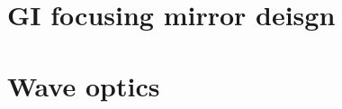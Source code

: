 \documentclass{article}
\begin{document}

	\section{GI focusing mirror deisgn}

	\section{Wave optics}
	{\let\section\subsection
	\let\subsection\subsubsection
	
	}
\end{document}
